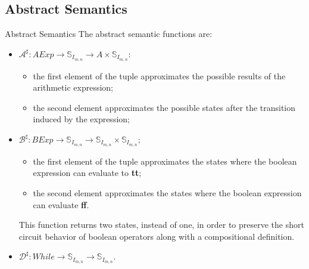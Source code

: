 \subsection{Abstract Semantics}

\begin{frame}{Abstract Semantics}
    The abstract semantic functions are:
    \begin{itemize}
        \item $\mathcal{A}^\sharp : AExp \to \mathbb{S}_{I_{m,n}} \to A \times \mathbb{S}_{I_{m,n}}$:
        \begin{itemize}
            \item the first element of the tuple approximates the possible results of the arithmetic expression;
            \item the second element approximates the possible states after the transition induced by the expression;
        \end{itemize}
        \item $\mathcal{B}^\sharp : BExp \to \mathbb{S}_{I_{m,n}} \to \mathbb{S}_{I_{m,n}} \times \mathbb{S}_{I_{m,n}}$;
        \begin{itemize}
            \item the first element of the tuple approximates the states where the boolean expression can evaluate to \textbf{tt};
            \item the second element approximates the states where the boolean expression can evaluate \textbf{ff}.
        \end{itemize}
        This function returns two states, instead of one, in order to preserve the short circuit behavior of boolean operators along with a compositional definition.
        \item $\mathcal{D}^\sharp : While \to \mathbb{S}_{I_{m,n}} \to\mathbb{S}_{I_{m,n}}$.
    \end{itemize}
\end{frame}

